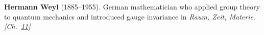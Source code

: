\textbf{Hermann Weyl} (1885–1955). German mathematician who applied group theory to quantum mechanics and introduced gauge invariance in \emph{Raum, Zeit, Materie}. \emph{[Ch.~\hyperref[ch:topologicalinsulators]{11}]}


